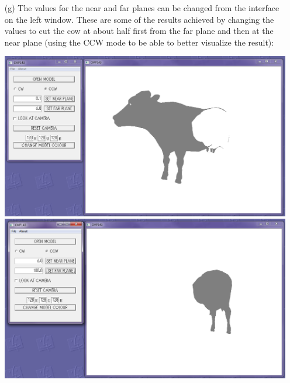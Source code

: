 \documentclass[12pt]{article}
\begin{document}
\begin{itemize}
\item[(g)] The values for the near and far planes can be changed from the interface on the left window. These are some of the results achieved by changing the values to cut the cow at about half first from the far plane and then at the near plane (using the CCW mode to be able to better visualize the result):
\begin{center}
	\includegraphics[scale=0.5]{11.png}
	\includegraphics[scale=0.5]{12.png}
\end{center}


\end{itemize}
\end{document}
